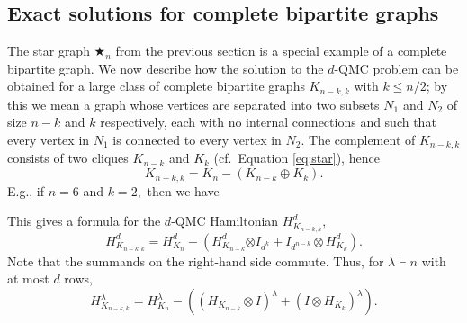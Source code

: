 \documentclass[12pt,dvipsnames,accepted=2016-08-18,a4paper,onecolumn]{quantumarticle}
\def\starn{{\bigstar_{n}}}
\numberwithin{equation}{section}
\theoremstyle{definition}
\begin{document}
\subsection{Exact solutions for complete bipartite graphs} \label{sec:bipartite}
The star graph $\starn$ from the previous section is a special example of a complete bipartite graph. We now describe how the solution to the $d$-QMC problem can be obtained for a large class of complete bipartite graphs $K_{n-k,k}$ with $k \leq n/2$; by this we mean a graph whose vertices are separated into two subsets $N_1$ and $N_2$ of size $n-k$ and $k$ respectively, each with no internal connections and such that every vertex in $N_1$ is connected to every vertex in $N_2.$
The complement of $K_{n-k,k}$ consists of two cliques $K_{n-k}$ and $K_k$ (cf.~Equation \eqref{eq:star}), hence
\begin{equation}\label{eq:signed}
K_{n-k,k} = K_{n} - (K_{n-k} \oplus K_k).
\end{equation}
E.g., if $n=6$ and $k=2,$ then we have
	\begin{center}
\end{center}
This gives a formula for the $d$-QMC Hamiltonian $H_{K_{n-k,k}}^{d},$ 
$$
H_{K_{n-k,k}}^{d} = H_{K_{n}}^{d} - 
\left(H_{K_{n-k}}^{d}{\otimes I_{d^k}} + {I_{d^{n-k}}\otimes }H_{K_k}^{d}\right).
$$
Note that the summands on the right-hand side commute.
Thus, for $\lambda \vdash n$ with at most $d$ rows,
\begin{equation}\label{eq:pre_n+m}
H_{K_{n-k,k}}^\lambda = H_{K_{n}}^\lambda - 
\left( (H_{K_{n-k}}\otimes I)^\lambda + (I\otimes H_{K_k})^\lambda\right).
\end{equation}
\end{document}
